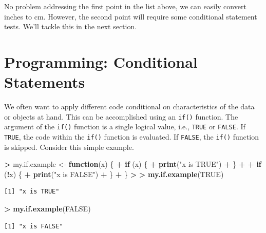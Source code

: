 \documentclass[]{krantz}
\makeatletter
\newenvironment{Shaded}{\begin{snugshade}}{\end{snugshade}}
\newcommand{\KeywordTok}[1]{\textcolor[rgb]{0.27,0.27,0.27}{\textbf{#1}}}
\newcommand{\StringTok}[1]{\textcolor[rgb]{0.5,0.5,0.5}{#1}}
\newcommand{\OtherTok}[1]{\textcolor[rgb]{0.37,0.37,0.37}{#1}}
\newcommand{\ControlFlowTok}[1]{\textcolor[rgb]{0.27,0.27,0.27}{\textbf{#1}}}
\newcommand{\OperatorTok}[1]{\textcolor[rgb]{0.43,0.43,0.43}{\textbf{#1}}}
\newcommand{\ErrorTok}[1]{\textcolor[rgb]{0.14,0.14,0.14}{\textbf{#1}}}
\newcommand{\NormalTok}[1]{#1}
\newenvironment{kframe}{%
\medskip{}
\setlength{\fboxsep}{.8em}
 \def\at@end@of@kframe{}%
 \ifinner\ifhmode%
  \def\at@end@of@kframe{\end{minipage}}%
  \begin{minipage}{\columnwidth}%
 \fi\fi%
 \def\FrameCommand##1{\hskip\@totalleftmargin \hskip-\fboxsep
 \colorbox{shadecolor}{##1}\hskip-\fboxsep
     \hskip-\linewidth \hskip-\@totalleftmargin \hskip\columnwidth}%
 \MakeFramed {\advance\hsize-\width
   \@totalleftmargin\z@ \linewidth\hsize
   \@setminipage}}%
 {\par\unskip\endMakeFramed%
 \at@end@of@kframe}
\renewenvironment{Shaded}{\begin{kframe}}{\end{kframe}}
\theoremstyle{definition}
\theoremstyle{definition}
\theoremstyle{definition}
\theoremstyle{remark}
\makeatother
\begin{document}
No problem addressing the first point in the list above, we can easily
convert inches to cm. However, the second point will require some
conditional statement tests. We'll tackle this in the next section.

\section{Programming: Conditional
Statements}\label{programming-conditional-statements}

We often want to apply different code conditional on characteristics of
the data or objects at hand. This can be accomplished using an
\texttt{if()} function. The argument of the \texttt{if()} function is a
single logical value, i.e., \texttt{TRUE} or \texttt{FALSE}. If
\texttt{TRUE}, the code within the \texttt{if()} function is evaluated.
If \texttt{FALSE}, the \texttt{if()} function is skipped. Consider this
simple example.

\begin{Shaded}
\begin{Highlighting}[]
\OperatorTok{>}\StringTok{ }\NormalTok{my.if.example <-}\StringTok{ }\ControlFlowTok{function}\NormalTok{(x) \{}
\OperatorTok{+}\StringTok{   }\ControlFlowTok{if}\NormalTok{ (x) \{}
\OperatorTok{+}\StringTok{     }\KeywordTok{print}\NormalTok{(}\StringTok{"x is TRUE"}\NormalTok{)}
\OperatorTok{+}\StringTok{   }\NormalTok{\}}
\OperatorTok{+}\StringTok{   }
\OperatorTok{+}\StringTok{   }\ControlFlowTok{if}\NormalTok{ (}\OperatorTok{!}\NormalTok{x) \{}
\OperatorTok{+}\StringTok{     }\KeywordTok{print}\NormalTok{(}\StringTok{"x is FALSE"}\NormalTok{)}
\OperatorTok{+}\StringTok{   }\NormalTok{\}}
\OperatorTok{+}\StringTok{ }\NormalTok{\}}
\OperatorTok{>}\StringTok{ }
\ErrorTok{>}\StringTok{ }\KeywordTok{my.if.example}\NormalTok{(}\OtherTok{TRUE}\NormalTok{)}
\end{Highlighting}
\end{Shaded}

\begin{verbatim}
[1] "x is TRUE"
\end{verbatim}

\begin{Shaded}
\begin{Highlighting}[]
\OperatorTok{>}\StringTok{ }\KeywordTok{my.if.example}\NormalTok{(}\OtherTok{FALSE}\NormalTok{)}
\end{Highlighting}
\end{Shaded}

\begin{verbatim}
[1] "x is FALSE"
\end{verbatim}
\end{document}
